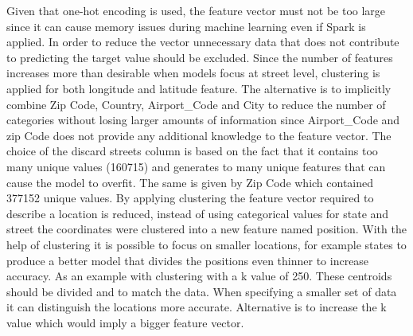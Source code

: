 \documentclass[../main.tex]{subfiles}
\begin{document}
\begin{table}[H]
\centering
{}
\caption{The process of cleaning and working with the data before machine learning.}
\label{tab:preprocess_model}
\end{table}
Given that one-hot encoding is used, the feature vector must not be too large since it can cause memory issues during machine learning even if Spark is applied. In order to reduce the vector unnecessary data that does not contribute to predicting the target value should be excluded. Since the number of features increases more than desirable when models focus at street level, clustering is applied for both longitude and latitude feature. The alternative is to implicitly combine Zip Code, Country, Airport\_Code and City to reduce the number of categories without losing larger amounts of information since Airport\_Code and zip Code does not provide any additional knowledge to the feature vector. The choice of the discard streets column is based on the fact that it contains too many unique values (160715) and generates to many unique features that can cause the model to overfit. The same is given by Zip Code which contained 377152 unique values. By applying clustering the feature vector required to describe a location is reduced, instead of using categorical values for state and street the coordinates were clustered into a new feature named position. With the help of clustering it is possible to focus on smaller locations, for example states to produce a better model that divides the positions even thinner to increase accuracy. As an example with clustering with a k value of 250. These centroids should be divided and to match the data. When specifying a smaller set of data it can distinguish the locations more accurate. Alternative is to increase the k value which would imply a bigger feature vector. 
\end{document}
